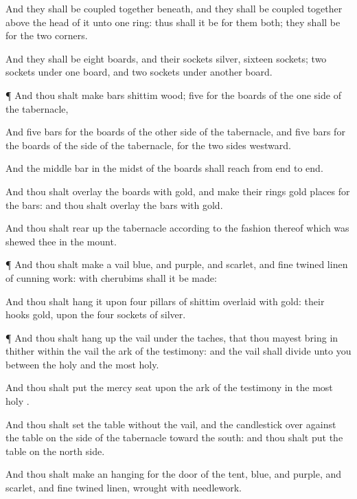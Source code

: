 {And they shall be
coupled together
beneath, and they shall be
coupled
together above the
head of it unto
one
ring: thus shall it be for them
both; they shall be for the
two
corners.

And they shall be
eight
boards, and their
sockets
{}
silver,
sixteen
sockets;
two
sockets under
one
board, and
two
sockets under
another
board.


\par }{\PP {}¶ And thou shalt
make
bars
{}
shittim
wood;
five for the
boards of the
one
side of the
tabernacle,

And
five
bars for the
boards of the
other
side of the
tabernacle, and
five
bars for the
boards of the
side of the
tabernacle, for the two
sides
westward.

And the
middle
bar in the
midst of the
boards shall
reach from
end to
end.

And thou shalt
overlay the
boards with
gold, and
make their
rings
{}
gold
{}
places for the
bars: and thou shalt
overlay the
bars with
gold.

And thou shalt rear
up the
tabernacle according to the
fashion thereof which was
shewed thee in the
mount.


\par }{\PP {}¶ And thou shalt
make a
vail
{}
blue, and
purple, and
scarlet, and fine
twined
linen of
cunning
work: with
cherubims shall it be
made:

And thou shalt
hang it upon
four
pillars of
shittim
{}
overlaid with
gold: their
hooks
{}
gold, upon the
four
sockets of
silver.


\par }{\PP {}¶ And thou shalt hang
up the
vail under the
taches, that thou mayest
bring in thither
within the
vail the
ark of the
testimony: and the
vail shall
divide unto you between the
holy
{} and the
most
holy.

And thou shalt
put the mercy
seat upon the
ark of the
testimony in the
most
holy
{}.

And thou shalt
set the
table
without the
vail, and the
candlestick over
against the
table on the
side of the
tabernacle toward the
south: and thou shalt
put the
table on the
north
side.

And thou shalt
make an
hanging for the
door of the
tent,
{}
blue, and
purple, and
scarlet, and fine
twined
linen,
wrought with
needlework.

}

